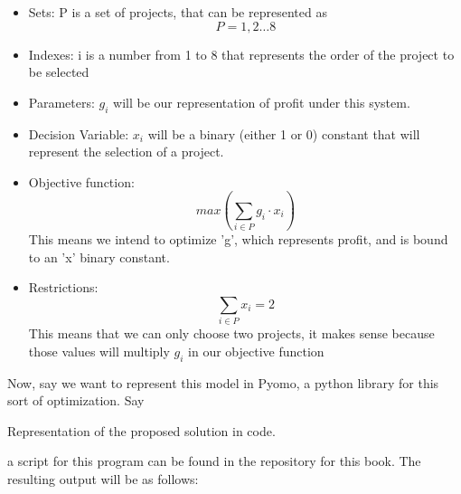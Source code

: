 \documentclass{textbook}
\begin{document}
\begin{itemize}
    \item Sets: P is a set of projects, that can be represented as $$P = {1,2 \dots 8}$$
    \item Indexes: i is a number from 1 to 8 that represents the order of the project to be selected
    \item Parameters: $g_i$ will be our representation of profit under this system.
    \item Decision Variable: $x_i$ will be a binary (either 1 or 0) constant that will represent the selection of a project.
    \item Objective function: $$max(\sum_{i \in P} g_{i} \cdot x_{i})$$ This means we intend to optimize 'g', which represents profit, and is bound to an 'x' binary constant.
    \item Restrictions: $$\sum_{i \in P} x_i = 2$$ This means that we can only choose two projects, it makes sense because those values will multiply $g_i$ in our objective function
\end{itemize}

Now, say we want to represent this model in Pyomo, a python library for this sort of optimization. Say


    {Representation of the proposed solution in code.}

a script for this program can be found in the repository for this book. The resulting output will be as follows:
\end{document}
